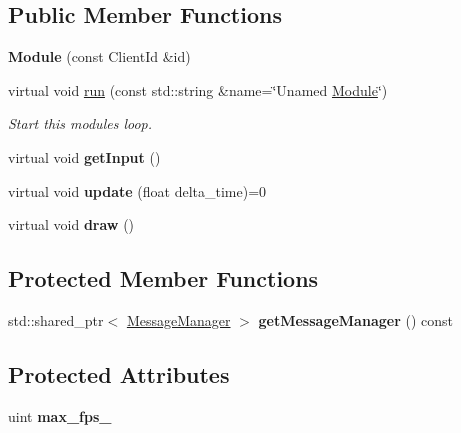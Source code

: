 \subsection*{Public Member Functions}
\begin{DoxyCompactItemize}
\item 
\mbox{\label{classTarbora_1_1Module_a9b8cd7c58bfdede1cfad00854dd4fa6b}} 
{\bfseries Module} (const Client\+Id \&id)
\item 
virtual void \hyperlink{classTarbora_1_1Module_a8c0352045b21b985d3798caa3190c70b}{run} (const std\+::string \&name=\char`\"{}Unamed \hyperlink{classTarbora_1_1Module}{Module}\char`\"{})
\begin{DoxyCompactList}\small\item\em Start this module\textquotesingle{}s loop. \end{DoxyCompactList}\item 
\mbox{\label{classTarbora_1_1Module_a72b275060190479d24616564384cb891}} 
virtual void {\bfseries get\+Input} ()
\item 
\mbox{\label{classTarbora_1_1Module_a9d7b1d6f34c2ed64f628d1c958ba1719}} 
virtual void {\bfseries update} (float delta\+\_\+time)=0
\item 
\mbox{\label{classTarbora_1_1Module_a9dfb5e4073e01bb09899a2001b6c65d0}} 
virtual void {\bfseries draw} ()
\end{DoxyCompactItemize}
\subsection*{Protected Member Functions}
\begin{DoxyCompactItemize}
\item 
\mbox{\label{classTarbora_1_1Module_a8e97a14fd27c595d1794ce859ae332b0}} 
std\+::shared\+\_\+ptr$<$ \hyperlink{classTarbora_1_1MessageManager}{Message\+Manager} $>$ {\bfseries get\+Message\+Manager} () const
\end{DoxyCompactItemize}
\subsection*{Protected Attributes}
\begin{DoxyCompactItemize}
\item 
\mbox{\label{classTarbora_1_1Module_abc87fb2d39229905dfa1e8e4539f916c}} 
uint {\bfseries max\+\_\+fps\+\_\+}
\end{DoxyCompactItemize}
